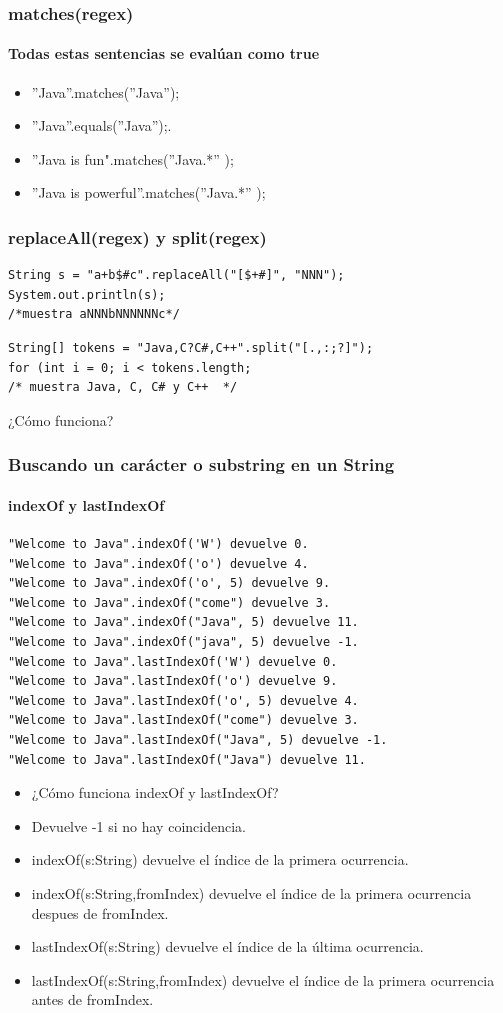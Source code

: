 \documentclass{beamer}
\begin{document}
\begin{frame}
    \frametitle{matches(regex)}
    \framesubtitle{Todas estas sentencias se evalúan como \alert{true}}
\begin{itemize}[<+-| alert@+>]
\item ''Java''.matches(''Java'');
\item ''Java''.equals(''Java'');.
\item ''Java is fun".matches(''Java.*'' );
\item ''Java is powerful''.matches(''Java.*'' );
\end{itemize}
\pause
\end{frame}

\begin{frame}[fragile]
\frametitle{replaceAll(regex) y split(regex)}
\begin{verbatim}
String s = "a+b$#c".replaceAll("[$+#]", "NNN");
System.out.println(s);
/*muestra aNNNbNNNNNNc*/
\end{verbatim}
\pause
\begin{verbatim}
String[] tokens = "Java,C?C#,C++".split("[.,:;?]");
for (int i = 0; i < tokens.length;
/* muestra Java, C, C# y C++  */
\end{verbatim}
\pause
¿Cómo funciona?
\end{frame}

\begin{frame}[fragile]
\frametitle{Buscando un carácter o substring en un String}
\framesubtitle{indexOf y lastIndexOf}
\begin{scriptsize}
\begin{verbatim}
"Welcome to Java".indexOf('W') devuelve 0.
"Welcome to Java".indexOf('o') devuelve 4.
"Welcome to Java".indexOf('o', 5) devuelve 9.
"Welcome to Java".indexOf("come") devuelve 3.
"Welcome to Java".indexOf("Java", 5) devuelve 11.
"Welcome to Java".indexOf("java", 5) devuelve -1.
"Welcome to Java".lastIndexOf('W') devuelve 0.
"Welcome to Java".lastIndexOf('o') devuelve 9.
"Welcome to Java".lastIndexOf('o', 5) devuelve 4.
"Welcome to Java".lastIndexOf("come") devuelve 3.
"Welcome to Java".lastIndexOf("Java", 5) devuelve -1.
"Welcome to Java".lastIndexOf("Java") devuelve 11.
\end{verbatim}
\pause
\begin{itemize}[<+->]
\item ¿Cómo funciona \alert{indexOf} y \alert{lastIndexOf}?
\item Devuelve \alert{-1} si no hay coincidencia.
\item \alert{indexOf(s:String)} devuelve el índice de la primera ocurrencia.
\item \alert{indexOf(s:String,fromIndex)} devuelve el índice de la primera ocurrencia despues de fromIndex.
\item \alert{lastIndexOf(s:String)} devuelve el índice de la última ocurrencia.
\item \alert{lastIndexOf(s:String,fromIndex)} devuelve el índice de la primera ocurrencia antes de fromIndex.
\end{itemize}
\end{scriptsize}
\pause
\end{frame}
\end{document}
